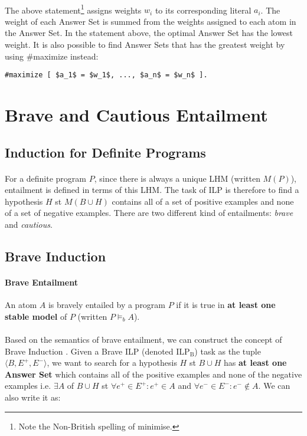 \documentclass{article}
\theoremstyle{plain}
\theoremstyle{definition}
\begin{document}
\begin{multicols}{2}
\paragraph{} The above statement\footnote{Note the Non-British spelling of minimise.} assigns weights $w_i$ to its corresponding literal $a_i$. The weight of each Answer Set is summed from the weights assigned to each atom in the Answer Set. In the statement above, the optimal Answer Set has the lowest weight. It is also possible to find Answer Sets that has the greatest weight by using \#maximize instead:

\begin{lstlisting}[mathescape=true]
#maximize [ $a_1$ = $w_1$, ..., $a_n$ = $w_n$ ].
\end{lstlisting}

\section{Brave and Cautious Entailment}

\subsection{Induction for Definite Programs}

\paragraph{} For a definite program $P$, since there is always a unique LHM (written $M(P)$), entailment is defined in terms of this LHM. The task of ILP is therefore to find a hypothesis $H$ st $M(B \cup H)$ contains all of a set of positive examples and none of a set of negative examples. There are two different kind of entailments: \textit{brave} and \textit{cautious}. 

\subsection{Brave Induction}
\paragraph{Brave Entailment} An atom $A$ is bravely entailed by a program $P$ if it is true in \textbf{at least one stable model} of $P$ (written $P \models_b A$).

\paragraph{} Based on the semantics of brave entailment, we can construct the concept of Brave Induction  \cite{sakama08}. Given a Brave ILP (denoted $\text{ILP}_\text{B}$) task as the tuple $\langle B, E^+, E^- \rangle$, we want to search for a hypothesis $H$ st $B \cup H$ has \textbf{at least one Answer Set} which contains all of the positive examples and none of the negative examples i.e. $\exists A$ of $B \cup H$ st $\forall e^+ \in E^+: e^+ \in A$ and $\forall e^- \in E^-: e^- \not\in A$. We can also write it as:


\end{multicols}
\end{document}
